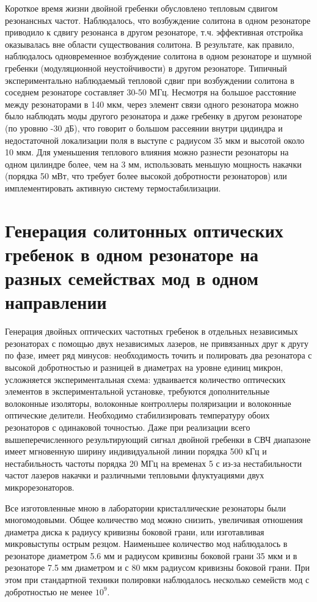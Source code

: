 Короткое время жизни двойной гребенки обусловлено тепловым сдвигом резонансных частот. Наблюдалось, что возбуждение солитона в одном резонаторе приводило к сдвигу резонанса в другом резонаторе, т.ч. эффективная отстройка оказывалась вне области существования солитона. В результате, как правило, наблюдалось одновременное возбуждение солитона в одном резонаторе и шумной гребенки (модуляционной неустойчивости) в другом резонаторе. Типичный экспериментально наблюдаемый тепловой сдвиг при возбуждении солитона в соседнем резонаторе составляет 30-50 МГц. Несмотря на большое расстояние между резонаторами в 140 мкм, через элемент связи одного резонатора можно было наблюдать моды другого резонатора и даже гребенку в другом резонаторе (по уровню -30 дБ), что говорит о большом рассеянии внутри цидиндра и недостаточной локализации поля в выступе с радиусом 35 мкм и высотой около 10 мкм. Для уменьшения теплового влияния можно разнести резонаторы на одном цилиндре более, чем на 3 мм, использовать меньшую мощность накачки (порядка 50 мВт, что требует более высокой добротности резонаторов) или имплементировать активную систему термостабилизации.

\section{Генерация солитонных оптических гребенок в одном резонаторе на разных семействах мод в одном направлении}

Генерация двойных оптических частотных гребенок в отдельных независимых резонаторах с помощью двух независимых лазеров, не привязанных друг к другу по фазе, имеет ряд минусов: необходимость точить и полировать два резонатора с высокой добротностью и разницей в диаметрах на уровне единиц микрон, усложняется экспериментальная схема: удваивается количество оптических элементов в экспериментальной установке, требуются дополнительные волоконные изоляторы, волоконные контроллеры поляризации и волоконные оптические делители. Необходимо стабилизировать температуру обоих резонаторов с одинаковой точностью. Даже при реализации всего вышеперечисленного результирующий сигнал двойной гребенки в СВЧ диапазоне имеет мгновенную ширину индивидуальной линии порядка 500 кГц и нестабильность частоты порядка 20 МГц на временах 5 с из-за нестабильности частот лазеров накачки и различными тепловыми флуктуациями двух микрорезонаторов.

Все изготовленные мною в лаборатории кристаллические резонаторы были многомодовыми. Общее количество мод можно снизить, увеличивая отношения диаметра диска к радиусу кривизны боковой грани, или изготавливая микровыступы острым резцом. Наименьшее количество мод наблюдалось в резонаторе диаметром 5.6 мм и радиусом кривизны боковой грани 35 мкм и в резонаторе 7.5 мм диаметром и с 80 мкм радиусом кривизны боковой грани. При этом при стандартной техники полировки наблюдалось несколько семейств мод с добротностью не менее $10^9$.

